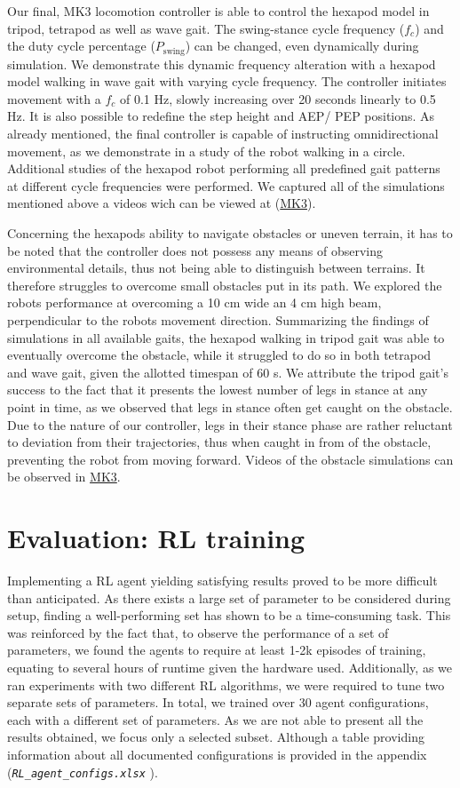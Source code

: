 Our final, MK3 locomotion controller is able to control the hexapod model in tripod, tetrapod as well as wave gait.
The swing-stance cycle frequency ($f_c$) and the duty cycle percentage ($P_\text{swing}$) can be changed, even dynamically during simulation.
We demonstrate this dynamic frequency alteration with a hexapod model walking in wave gait with varying cycle frequency.
The controller initiates movement with a $f_c$ of 0.1 Hz, slowly increasing over 20 seconds linearly to 0.5 Hz. 
It is also possible to redefine the step height and AEP/ PEP positions.
As already mentioned, the final controller is capable of instructing omnidirectional movement, as we demonstrate in a study of the robot walking in a circle.
Additional studies of the hexapod robot performing all predefined gait patterns at different cycle frequencies were performed.
We captured all of the simulations mentioned above a videos wich can be viewed at (\hyperref[vid: MK1]{MK3}).

Concerning the hexapods ability to navigate obstacles or uneven terrain, it has to be noted that the controller does not possess any means of observing environmental details, thus not being able to distinguish between terrains.
It therefore struggles to overcome small obstacles put in its path.
We explored the robots performance at overcoming a 10 cm wide an 4 cm high beam, perpendicular to the robots movement direction.
Summarizing the findings of simulations in all available gaits, the hexapod walking in tripod gait was able to eventually overcome the obstacle, while it struggled to do so in both tetrapod and wave gait, given the allotted timespan of 60 s.
We attribute the tripod gait's success to the fact that it presents the lowest number of legs in stance at any point in time, as we observed that legs in stance often get caught on the obstacle.
Due to the nature of our controller, legs in their stance phase are rather reluctant to deviation from their trajectories, thus when caught in from of the obstacle, preventing the robot from moving forward.
Videos of the obstacle simulations can be observed in \hyperref[vid: MK1]{MK3}.


\section{Evaluation: RL training}

Implementing a RL agent yielding satisfying results proved to be more difficult than anticipated.
As there exists a large set of parameter to be considered during setup, finding a well-performing set has shown to be a time-consuming task.
This was reinforced by the fact that, to observe the performance of a set of parameters, we found the agents to require at least 1-2k episodes of training, equating to several hours of runtime given the hardware used.
Additionally, as we ran experiments with two different RL algorithms, we were required to tune two separate sets of parameters.
In total, we trained over 30 agent configurations, each with a different set of parameters.
As we are not able to present all the results obtained, we focus only a selected subset.
Although a table providing information about all documented configurations is provided in the appendix (\emph{\nolinkurl{RL_agent_configs.xlsx}	}).

